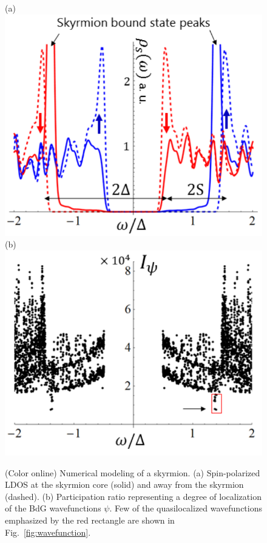 \documentclass[twocolumn,showpacs,floatfix,longbibliography]{revtex4-1}
\begin{document}
\begin{figure} \centering
	(a)\includegraphics[width=0.7\linewidth]{fig3a} \\
	(b)\includegraphics[width=0.7\linewidth]{fig3b}
	\caption{(Color online) Numerical modeling of a skyrmion. (a) Spin-polarized LDOS at the skyrmion core (solid) and away from the skyrmion (dashed).  (b) Participation ratio representing a degree of localization of the BdG wavefunctions $\psi$. Few of the quasilocalized wavefunctions emphasized by the red rectangle are shown in Fig.~\ref{fig:wavefunction}.} \label{fig:LDOSNumerics}
\end{figure}


\end{document}
